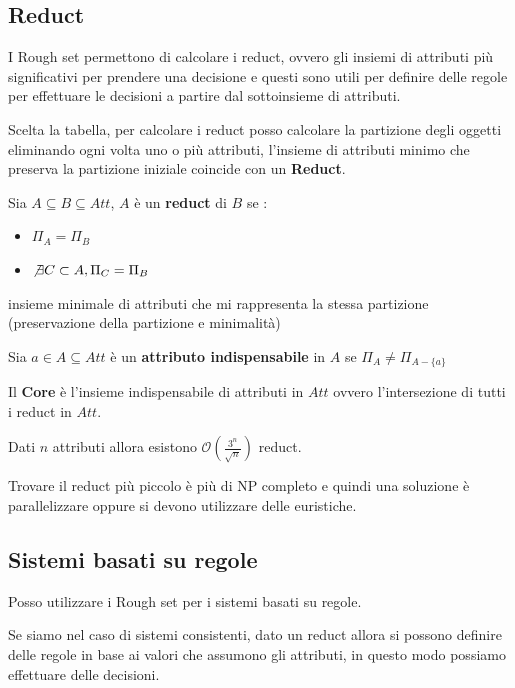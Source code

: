 \subsection{Reduct}

I Rough set permettono di calcolare i reduct, ovvero gli insiemi di attributi più 
significativi per prendere una decisione e questi sono utili per definire delle 
regole per effettuare le decisioni a partire dal sottoinsieme di attributi.

Scelta la tabella, per calcolare i reduct posso calcolare la partizione degli oggetti 
eliminando ogni volta uno o più attributi, l'insieme di attributi minimo che preserva 
la partizione iniziale coincide con un \textbf{Reduct}. 

\begin{definizione}
    Sia $A\subseteq B\subseteq Att$, $A$ è un \textbf{reduct} di $B$ se :
    \begin{itemize}
        \item $\Pi_A = \Pi_B$
        \item $\not\exists C \subset A, \Pi_C=\Pi_B$
    \end{itemize}
    insieme minimale di attributi che mi rappresenta la stessa partizione (preservazione 
    della partizione e minimalità)
\end{definizione}
\begin{definizione}
    Sia $a \in A\subseteq Att$ è un \textbf{attributo indispensabile} in $A$ se $\Pi_A \ne \Pi_{A-\{a\}}$
\end{definizione}
\begin{definizione}
    Il \textbf{Core} è l'insieme indispensabile di attributi in $Att$ ovvero l'intersezione 
    di tutti i reduct in $Att$.
\end{definizione}

Dati $n$ attributi allora esistono $\mathcal{O} \left(\frac{3^n}{\sqrt{n}}\right)$ reduct.

Trovare il reduct più piccolo è più di NP completo e quindi una soluzione è parallelizzare 
oppure si devono utilizzare delle euristiche.


\subsection{Sistemi basati su regole}
Posso utilizzare i Rough set per i sistemi basati su regole. 

Se siamo nel caso di sistemi consistenti, dato un reduct allora si possono definire
delle regole in base ai valori che assumono gli attributi, in questo modo possiamo 
effettuare delle decisioni.

